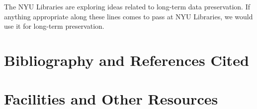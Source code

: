 \documentclass[11pt]{article}
\begin{document}
The NYU Libraries are exploring ideas related to long-term data preservation.
If anything appropriate along these lines comes to pass at NYU Libraries, we would use it for long-term preservation.

\clearpage
\section*{Bibliography and References Cited}

\renewcommand{\bibsection}{}


\clearpage
\section*{Facilities and Other Resources}

\end{document}
